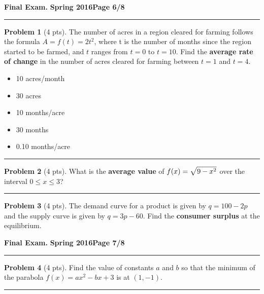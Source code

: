 \documentclass[12pt]{article}
\makeatletter
\theoremstyle{definition}
\newtheorem{problem}{Problem}
\newcommand*{\radiobutton}{%
  \@ifstar{\@radiobutton0}{\@radiobutton1}%
}
\newcommand*{\@radiobutton}[1]{%
  \begin{tikzpicture}
    \pgfmathsetlengthmacro\radius{height("X")/2}
    \draw[radius=\radius] circle;
    \ifcase#1 \fill[radius=.6*\radius] circle;\fi
  \end{tikzpicture}%
}
\makeatother
\begin{document}
\newpage

\hfill{\large\bf Final Exam.}\hfill{\large\bf
  Spring 2016}\hfill{\large\bf Page 6/8}\hrule

\bigskip 

\begin{problem}[4 pts]
The number of acres in a region cleared for farming follows the formula $A = f (t) = 2t^2$, where t is the number of months since the region started to be farmed, and $t$ ranges from $t = 0$ to $t = 10$. Find the \textbf{average rate of change} in the number of acres cleared for farming between $t = 1$ and $t = 4$. 
\begin{itemize}
\item[\radiobutton] 10 acres/month
\item[\radiobutton] 30 acres
\item[\radiobutton] 10 months/acre
\item[\radiobutton] 30 months
\item[\radiobutton] 0.10 months/acre
\end{itemize}
\end{problem}

\hrule

\begin{problem}[4 pts]
What is the \textbf{average value} of $f(x) = \displaystyle{\sqrt{\vphantom{\lvert} 9-x^2}}$ over the interval $0 \leq x \leq 3$? 
\end{problem}
\vspace{4cm}
\hrule

\begin{problem}[4 pts]
The demand curve for a product is given by $q=100-2p$ and the supply curve is given by $q=3p-60$.  Find the \textbf{consumer surplus} at the equilibrium.
\end{problem}

\newpage

\hfill{\large\bf Final Exam.}\hfill{\large\bf
  Spring 2016}\hfill{\large\bf Page 7/8}\hrule

\bigskip

\begin{problem}[4 pts]
Find the value of constants $a$ and $b$ so that the minimum of the parabola $f(x) = ax^2 -bx +3$ is at $(1,-1)$.

\vspace{5cm}
\end{problem}
\hrule
\end{document}
